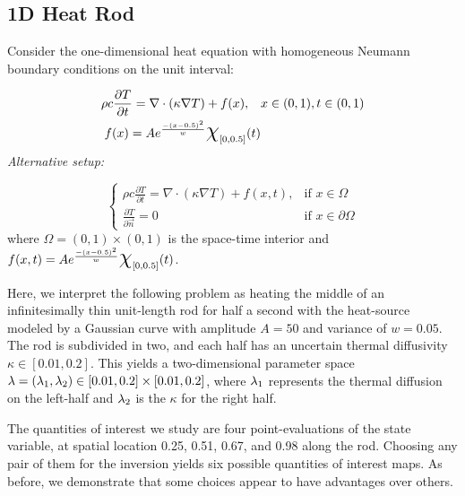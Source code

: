 \subsection{1D Heat Rod}\label{sec:nonlinear}
Consider the one-dimensional heat equation with homogeneous Neumann boundary conditions on the unit interval:

\begin{equation}
\begin{split}
\rho c \frac{\partial T}{\partial t} = \nabla \cdot ( \kappa \nabla T) + f(x), \quad & x\in (0,1), t\in (0,1) \\
f(x) = A e^\frac{- (x-0.5)^2}{w} \Chi_{[0,0.5]}(t) 
\end{split}
\end{equation}
\emph{Alternative setup: }

\begin{equation}
\begin{cases}
\rho c \frac{\partial T}{\partial t} = \nabla \cdot ( \kappa \nabla T) + f(x,t), & \text{if } x\in \Omega \\
\frac{\partial T}{\partial \vec{n}} = 0 & \text{if } x\in \partial \Omega
\end{cases}
\end{equation}
where $\Omega = (0,1)\times (0,1)$ is the space-time interior and $f(x,t) = A e^\frac{- (x-0.5)^2}{w} \Chi_{[0,0.5]}(t)$. 

Here, we interpret the following problem as heating the middle of an infinitesimally thin unit-length rod for half a second with the heat-source modeled by a Gaussian curve with amplitude $A=50$ and variance of $w=0.05$. 
The rod is subdivided in two, and each half has an uncertain thermal diffusivity $\kappa \in [0.01, 0.2]$.
This yields a two-dimensional parameter space $\lambda = (\lambda_1, \lambda_2) \in [0.01, 0.2]\times [0.01, 0.2]$, where $\lambda_1$ represents the thermal diffusion on the left-half and $\lambda_2$ is the $\kappa$ for the right half.

The quantities of interest we study are four point-evaluations of the state variable, at spatial location 0.25, 0.51, 0.67, and 0.98 along the rod.
Choosing any pair of them for the inversion yields six possible quantities of interest maps. 
As before, we demonstrate that some choices appear to have advantages over others. 

